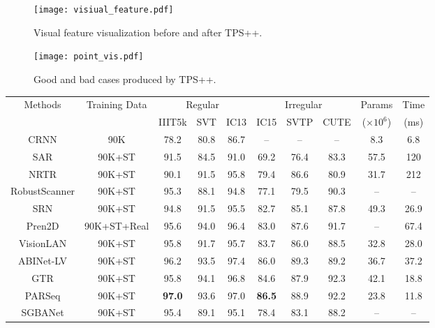 \documentclass{article}
\begin{document}
\begin{figure}[t]
\centering
\texttt{[image:  visiual\_feature.pdf]} 
\caption{Visual feature visualization before and after TPS++.}
\label{fig1:vis_feature}
\end{figure}
\begin{figure}[t]
\centering
\texttt{[image:  point\_vis.pdf]} 
\caption{Good and bad cases produced by TPS++.}
\label{fig:vis_point}
\end{figure}


\begin{table*}[h]
\centering
\begin{tabular}{c|c|c|c|c|c|c|c|c|c}
	\hline
	\multirow{2}{*}{Methods} & \multirow{2}{*}{Training Data}   & \multicolumn{3}{c}{Regular} & \multicolumn{3}{|c|}{Irregular} & \multirow{1}{*}{Params} &\multirow{1}{*}{Time}  \\
\cline{3-8}
	&  &IIIT5k & SVT  & IC13 &  IC15 & SVTP & CUTE & ($\times 10^{6}$) & (ms)  \\
	\hline
CRNN\cite{ShiBY17crnn}  & 90K & 78.2  & 80.8 & 86.7 & -- & --& -- & 8.3 & 6.8 \\
SAR\cite{li2019sar} & 90K+ST & 91.5 & 84.5 & 91.0 & 69.2 & 76.4 & 83.3 & 57.5 & 120\\
NRTR\cite{sheng2019nrtr}  & 90K+ST & 90.1 & 91.5 & 95.8 & 79.4 & 86.6 & 80.9 & 31.7 & 212\\
RobustScanner\cite{yue2020robustscanner} & 90K+ST  & 95.3 & 88.1 & 94.8 & 77.1 & 79.5 & 90.3 & -- &--\\
SRN\cite{SRNyu2020towards}  & 90K+ST & 94.8 & 91.5 & 95.5 & 82.7 & 85.1 & 87.8 & 49.3 & 26.9\\
Pren2D\cite{yan2021primitive} & 90K+ST+Real & 95.6 & 94.0 & 96.4& 83.0 & 87.6& 91.7 & -- & 67.4\\
VisionLAN\cite{wang2021FTO} & 90K+ST  & 95.8& 91.7& 95.7 & 83.7 & 86.0 & 88.5 & 32.8 & 28.0\\
ABINet-LV\cite{ABInet21CVPR}  & 90K+ST & 96.2 &93.5& 97.4& 86.0 &89.3&89.2 & 36.7 & 37.2\\
GTR\cite{he2021S-GTR} & 90K+ST & 95.8 & 94.1 & 96.8 & 84.6 & 87.9 &92.3 & 42.1 & 18.8 \\
PARSeq\cite{bautista2022parseq}& 90K+ST &\textbf{97.0} &93.6 &  97.0 & \textbf{86.5} & 88.9 & 92.2& 23.8 & 11.8\\
SGBANet\cite{zhong2022sgbanet} & 90K+ST & 95.4 & 89.1 & 95.1 & 78.4 & 83.1 & 88.2  & -- &--\\


\end{tabular}
\end{table*}
\end{document}
